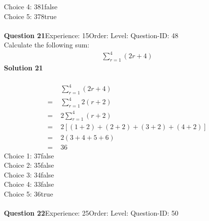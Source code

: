 \documentclass{article}
\begin{document}
Choice 4: \hspace{20pt}381\hspace{20pt}false\\
Choice 5: \hspace{20pt}378\hspace{20pt}true\\
\\[4pt]
\noindent\textbf{Question 21}\hspace{20pt}Experience: 15\hspace{20pt}Order: \hspace{20pt}Level: \hspace{20pt}Question-ID: 48\\[2pt]
Calculate the following sum:
\begin{align*}
\sum_{r=1}^{4} (2r+4)
\end{align*}
\noindent\textbf{Solution 21}\\[2pt]
\\[-35pt]\begin{align*}
&\sum_{r=1}^{4} (2r+4)\\[2pt]
=\,\,&\sum_{r=1}^{4} 2(r+2)\\[2pt]
=\,\,&2\sum_{r=1}^{4} (r+2)\\[2pt]
=\,\,&2[(1+2)+(2+2)+(3+2)+(4+2)]\\[2pt]
=\,\,&2(3+4+5+6)\\[2pt]
=\,\,&36
\end{align*}
Choice 1: \hspace{20pt}37\hspace{20pt}false\\
Choice 2: \hspace{20pt}35\hspace{20pt}false\\
Choice 3: \hspace{20pt}34\hspace{20pt}false\\
Choice 4: \hspace{20pt}33\hspace{20pt}false\\
Choice 5: \hspace{20pt}36\hspace{20pt}true\\
\\[4pt]
\noindent\textbf{Question 22}\hspace{20pt}Experience: 25\hspace{20pt}Order: \hspace{20pt}Level: \hspace{20pt}Question-ID: 50\\[2pt]
\end{document}
